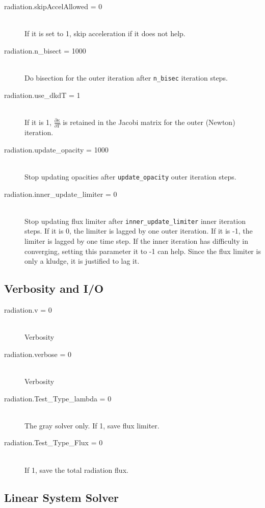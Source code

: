 \documentclass[11pt,letterpaper]{article}
\begin{document}
\begin{description}
\item[radiation.skipAccelAllowed = 0] \hfill \\
  If it is set to 1, skip acceleration if it does not help. 
\item[radiation.n\_bisect = 1000] \hfill \\
  Do bisection for the outer iteration after {\tt n\_bisec} iteration steps.
\item[radiation.use\_dkdT = 1] \hfill \\
  If it is 1, $\frac{\partial \kappa}{\partial T}$ is retained in the
  Jacobi matrix for the outer (Newton) iteration.  
\item[radiation.update\_opacity = 1000] \hfill \\
  Stop updating opacities after {\tt update\_opacity} outer iteration steps.
\item[radiation.inner\_update\_limiter = 0] \hfill \\
  Stop updating flux limiter after {\tt inner\_update\_limiter} inner
  iteration steps.  If it is 0, the limiter is lagged by one outer
  iteration.  If it is -1, the limiter is lagged by one time step.  If
  the inner iteration has difficulty in converging, setting this
  parameter it to -1 can help.  Since the flux limiter is only a
  kludge, it is justified to lag it. 
\end{description}

\subsection{Verbosity and I/O}
\label{sec:bothpar}

\begin{description}
\item[radiation.v = 0] \hfill \\
  Verbosity
\item[radiation.verbose = 0] \hfill \\
  Verbosity
\item[radiation.Test\_Type\_lambda = 0] \hfill \\
  The gray solver only.  If 1, save flux limiter.
\item[radiation.Test\_Type\_Flux = 0] \hfill \\
  If 1, save the total radiation flux. 
\end{description}

\subsection{Linear System Solver}
\label{sec:hypre}
\end{document}
